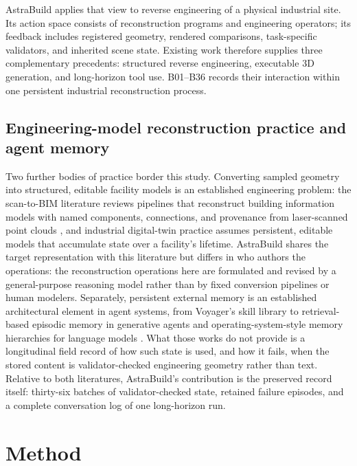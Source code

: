 \documentclass[10pt,a4paper]{article}
\begin{document}
AstraBuild applies that view to reverse engineering of a physical
industrial site. Its action space consists of reconstruction programs
and engineering operators; its feedback includes registered geometry,
rendered comparisons, task-specific validators, and inherited scene
state. Existing work therefore supplies three complementary precedents:
structured reverse engineering, executable 3D generation, and
long-horizon tool use. B01--B36 records their interaction within one
persistent industrial reconstruction process.

\hypertarget{engineering-model-reconstruction-practice-and-agent-memory}{%
\subsection{Engineering-model reconstruction practice and agent
memory}\label{engineering-model-reconstruction-practice-and-agent-memory}}

Two further bodies of practice border this study. Converting sampled
geometry into structured, editable facility models is an established
engineering problem: the scan-to-BIM literature reviews pipelines that
reconstruct building information models with named components,
connections, and provenance from laser-scanned point clouds
\citep{tang2010scanbim}, and industrial digital-twin practice assumes
persistent, editable models that accumulate state over a facility's
lifetime. AstraBuild shares the target representation with this
literature but differs in who authors the operations: the reconstruction
operations here are formulated and revised by a general-purpose
reasoning model rather than by fixed conversion pipelines or human
modelers. Separately, persistent external memory is an established
architectural element in agent systems, from Voyager's skill library to
retrieval-based episodic memory in generative agents
\citep{park2023generative} and operating-system-style memory hierarchies
for language models \citep{packer2023memgpt}. What those works do not
provide is a longitudinal field record of how such state is used, and
how it fails, when the stored content is validator-checked engineering
geometry rather than text. Relative to both literatures, AstraBuild's
contribution is the preserved record itself: thirty-six batches of
validator-checked state, retained failure episodes, and a complete
conversation log of one long-horizon run.

\hypertarget{method}{%
\section{Method}\label{method}}
\end{document}
